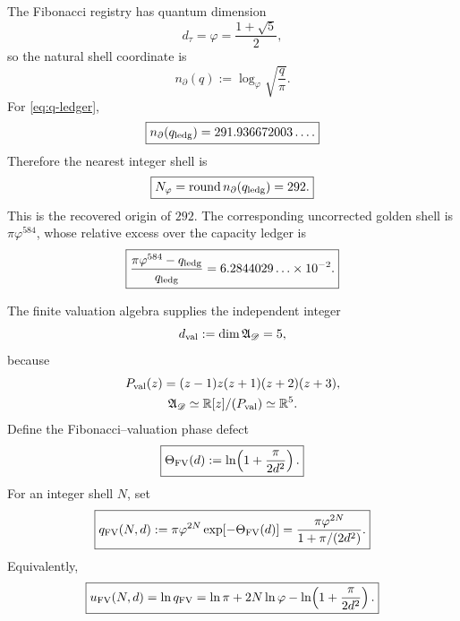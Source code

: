 \documentclass[aps,prd,reprint,nofootinbib,superscriptaddress,floatfix]{revtex4-2}
\numberwithin{equation}{section}
\theoremstyle{definition}
\theoremstyle{plain}
\begin{document}
The Fibonacci registry has quantum dimension
\[
d_\tau=\varphi=\frac{1+\sqrt5}{2},
\]
so the natural shell coordinate is
\begin{equation}
\boxed{
n_\partial(q):=\log_\varphi\sqrt{\frac{q}{\pi}} .
}
\label{eq:golden-shell-clock}
\end{equation}
For \eqref{eq:q-ledger},
\begin{equation}
\boxed{
n_\partial(q_{\rm ledg})
=
291.936672003\ldots .
}
\label{eq:n-ledger}
\end{equation}
Therefore the nearest integer shell is
\begin{equation}
\boxed{
N_\varphi=\operatorname{round} n_\partial(q_{\rm ledg})=292 .
}
\label{eq:Nphi-recovered}
\end{equation}
This is the recovered origin of \(292\).  The corresponding uncorrected golden shell is \(\pi\varphi^{584}\), whose relative excess over the capacity ledger is
\begin{equation}
\boxed{
\frac{\pi\varphi^{584}-q_{\rm ledg}}{q_{\rm ledg}}
=
6.2844029\ldots\times10^{-2}.
}
\label{eq:phi-excess}
\end{equation}

The finite valuation algebra supplies the independent integer
\[
d_{\rm val}:=\dim\mathfrak A_{\mathscr D}=5,
\]
because
\[
\begin{gathered}
P_{\rm val}(z)=(z-1)z(z+1)(z+2)(z+3),\\
\mathfrak A_{\mathscr D}
\simeq
\mathbb R[z]/(P_{\rm val})
\simeq
\mathbb R^5 .
\end{gathered}
\]
Define the Fibonacci--valuation phase defect
\begin{equation}
\boxed{
\Theta_{\rm FV}(d):=\ln\!\left(1+\frac{\pi}{2d^2}\right).
}
\end{equation}
For an integer shell \(N\), set
\begin{equation}
\boxed{
q_{\rm FV}(N,d)
:=
\pi\varphi^{2N}\exp[-\Theta_{\rm FV}(d)]
=
\frac{\pi\varphi^{2N}}{1+\pi/(2d^2)} .
}
\label{eq:qFV}
\end{equation}
Equivalently,
\begin{equation}
\boxed{
u_{\rm FV}(N,d)
=
\ln q_{\rm FV}
=
\ln\pi+2N\ln\varphi-\ln\!\left(1+\frac{\pi}{2d^2}\right).
}
\end{equation}
\end{document}
